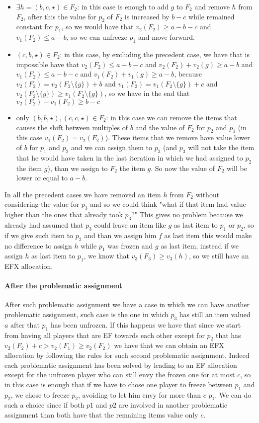 \begin{itemize}
    \item $\exists h=(b,c,\star)\in F_2$: in this case is enough to add $g$ to $F_2$ and remove $h$ from $F_2$, after this the value for $p_2$ of $F_2$ is increased by $b-c$ while remained constant for $p_1$, so we would have that $v_2(F_2)\ge a-b-c$ and $v_1(F_2) \le a-b$, so we can unfreeze $p_1$ and move forward. 
    \item $(c,b,\star)\in F_2$: in this case, by excluding the precedent case, we have that is impossible have that $v_2(F_2) \le a-b-c$ and $v_2(F_2) +v_2(g)\ge a-b$ and $v_1(F_2) \le a-b-c$ and $v_1(F_2) +v_1(g)\ge a-b$, because $v_2(F_2) = v_2(F_2\setminus \{g\}) + b$ and $v_1(F_2) = v_1(F_2\setminus \{g\}) + c$ and $v_2(F_2\setminus \{g\}) \ge v_1(F_2\setminus \{g\})$, so we have in the end that $v_2(F_2) - v_1(F_2) \ge b-c$
    \item only $(b,b,\star), (c,c,\star)\in F_2$: in this case we can remove the items that causes the shift between multiples of $b$ and the value of $F_2$ for $p_2$ and $p_1$ (in this case $v_1(F_2) = v_2(F_2)$). These items that we remove have value lower of $b$ for $p_1$ and $p_2$ and we can assign them to $p_3$ (and $p_3$ will not take the item that he would have taken in the last iteration in which we had assigned to $p_2$ the item $g$), than we assign to $F_2$ the item $g$. So now the value of $F_2$ will be lower or equal to $a-b$. 
\end{itemize}
In all the precedent cases we have removed an item $h$ from $F_2$ without considering the value for $p_3$ and so we could think "what if that item had value higher than the ones that already took $p_3$?" This gives no problem because we already had assumed that $p_3$ could leave an item like $g$ as last item to $p_1$ or $p_2$, so if we give such item to $p_2$ and than we assign him $f$ as last item this would make no difference to assign $h$ while $p_1$ was frozen and $g$ as last item, instead if we assign $h$ as last item to $p_1$, we know that $v_3(F_3)\ge v_3(h)$, so we still have an EFX allocation. 

\paragraph{After the problematic assignment} After such problematic assignment we have a case in which we can have another problematic assignment, such case is the one in which $p_3$ has still an item valued $a$ after that $p_1$ has been unfrozen. If this happens we have that since we start from having all players that are EF towards each other except for $p_2$ that has $v_2(F_2) + c > v_2(F_1) \ge v_2(F_2)$ we have that we can obtain an EFX allocation by following the rules for such second problematic assignment. Indeed each problematic assignment has been solved by leading to an EF allocation except for the unfrozen player who can still envy the frozen one for at most $c$, so in this case is enough that if we have to chose one player to freeze between $p_1$ and $p_2$, we chose to freeze $p_2$, avoiding to let him envy for more than $c$ $p_1$. We can do such a choice since if both $p1$ and $p2$ are involved in another problematic assignment than both have that the remaining items value only $c$.